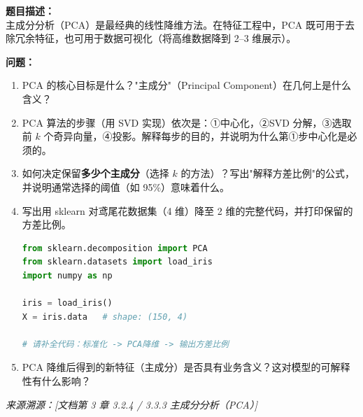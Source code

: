 \documentclass[a4paper,11pt]{ctexart}
\begin{document}
\begin{problembox}
    \textbf{题目描述：}\\
    主成分分析（PCA）是最经典的线性降维方法。在特征工程中，PCA 既可用于去除冗余特征，也可用于数据可视化（将高维数据降到 2--3 维展示）。

    \vspace{0.2cm}
    \textbf{问题：}
    \begin{enumerate}[(1)]
        \item PCA 的核心目标是什么？"主成分"（Principal Component）在几何上是什么含义？

        \item PCA 算法的步骤（用 SVD 实现）依次是：①中心化，②SVD 分解，③选取前 $k$ 个奇异向量，④投影。解释每步的目的，并说明为什么第①步中心化是必须的。

        \item 如何决定保留\textbf{多少个主成分}（选择 $k$ 的方法）？写出"解释方差比例"的公式，并说明通常选择的阈值（如 95\%）意味着什么。

        \item 写出用 sklearn 对鸢尾花数据集（4 维）降至 2 维的完整代码，并打印保留的方差比例。

        \begin{lstlisting}[language=Python]
from sklearn.decomposition import PCA
from sklearn.datasets import load_iris
import numpy as np

iris = load_iris()
X = iris.data   # shape: (150, 4)

# 请补全代码：标准化 -> PCA降维 -> 输出方差比例
        \end{lstlisting}

        \item PCA 降维后得到的新特征（主成分）是否具有业务含义？这对模型的可解释性有什么影响？
    \end{enumerate}
    {\color{gray}\small\textit{来源溯源：[文档第 3 章 3.2.4 / 3.3.3 主成分分析（PCA）]}}
\end{problembox}
\end{document}
